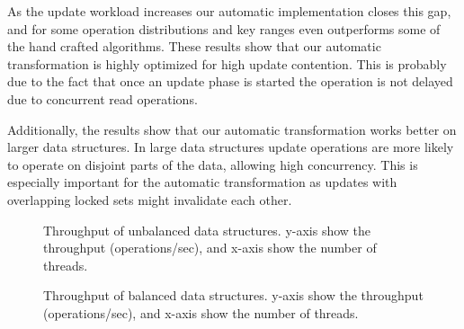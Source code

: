 As the update workload increases our automatic implementation 
closes this gap, and for some operation distributions and 
key ranges even outperforms some of the hand crafted algorithms.
These results show that our automatic transformation is highly optimized for
high update contention. This is probably due to the fact that once
an update phase is started the operation is not delayed due to concurrent 
read operations. 

Additionally, the results show that our automatic transformation 
works better on larger data structures. In large data structures 
update operations are more likely to operate on disjoint parts of 
the data, allowing high concurrency. This is especially important 
for the automatic transformation as updates  with overlapping 
locked sets might invalidate each other.  
 


\begin{figure*}
\begin{center}

\end{center}
\caption{Throughput of unbalanced data
structures.
y-axis show the throughput (operations/sec), 
and x-axis show the number of threads.
\label{evaluation:results:unbalanced}}
\end{figure*}


\begin{figure*}
\begin{center}


\end{center}
\caption{Throughput of balanced data
structures.
y-axis show the throughput (operations/sec), 
and x-axis show the number of threads.
\label{evaluation:results:balanced}}
\end{figure*}